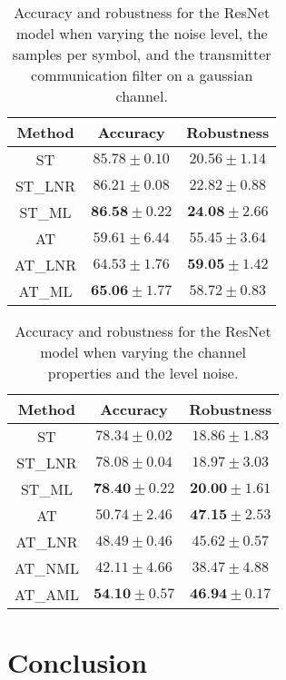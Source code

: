 \documentclass[conference]{IEEEtran}
\begin{document}
\begin{table}[htbp]
	\centering
	\begin{tabular}{c|cc}
	    Method & Accuracy & Robustness \\
		\hline
		ST & $85.78 \pm 0.10$ & $20.56 \pm 1.14$ \\ 
		ST\_LNR & $86.21 \pm 0.08$ & $22.82 \pm 0.88$ \\ 
		ST\_ML & $\textbf{86.58} \pm 0.22$ & $\textbf{24.08} \pm 2.66$ \\
        \hline
		AT & $59.61 \pm 6.44$ & $55.45 \pm 3.64$ \\ 
		AT\_LNR & $64.53 \pm 1.76$ & $\textbf{59.05} \pm 1.42$ \\ 
		AT\_ML & $\textbf{65.06} \pm 1.77$ & $58.72 \pm 0.83$ \\ 
    \end{tabular}
    \caption{Accuracy and robustness for the ResNet model when varying the noise level, the samples per symbol, and the transmitter communication filter on a gaussian channel.}
    \label{tab:sawgn2p}
\end{table}

\begin{table}[htbp]
	\centering
	\begin{tabular}{c|cc}
	    Method & Accuracy & Robustness \\
		\hline
		ST & $78.34 \pm 0.02$ & $18.86 \pm 1.83$ \\ 
		ST\_LNR & $78.08 \pm 0.04$ & $18.97 \pm 3.03$ \\ 
		ST\_ML & $\textbf{78.40} \pm 0.22$ & $\textbf{20.00} \pm 1.61$ \\
		\hline
		AT & $50.74 \pm 2.46$ & $\textbf{47.15} \pm 2.53$ \\ 
		AT\_LNR & $48.49 \pm 0.46$ & $45.62 \pm 0.57$ \\  
		AT\_NML & $42.11 \pm 4.66$ & $38.47 \pm 4.88$ \\  
		AT\_AML & $\textbf{54.10} \pm 0.57$ & $\textbf{46.94} \pm 0.17$ \\ 
    \end{tabular}
    \caption{Accuracy and robustness for the ResNet model when varying the channel properties and the level noise.}
    \label{tab:sp0c20}
\end{table}


\section{Conclusion}
\end{document}
